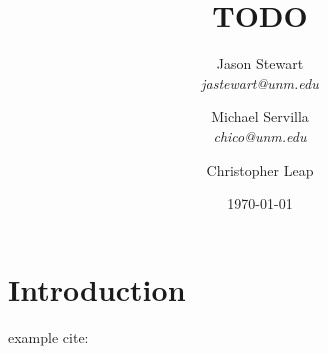 \documentclass{article}
\title{TODO}
\author{Jason Stewart\\
\textit{jastewart@unm.edu} 
\and
Michael Servilla\\
\textit{chico@unm.edu}
\and
Christopher Leap\\
\textit{\todoChris{email}}
\date{\today}
}
\begin{document}
\maketitle

\section{Introduction}
example cite: \cite{cfb_db}


\newpage
\nocite{*}


\end{document}
